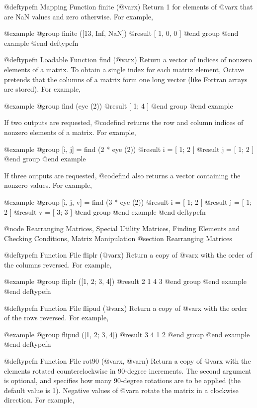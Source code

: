 @deftypefn {Mapping Function} {} finite (@var{x})
Return 1 for elements of @var{x} that are NaN values and zero
otherwise. For example,

@example
@group
finite ([13, Inf, NaN])
     @result{} [ 1, 0, 0 ]
@end group
@end example
@end deftypefn

@deftypefn {Loadable Function} {} find (@var{x})
Return a vector of indices of nonzero elements of a matrix.  To obtain a
single index for each matrix element, Octave pretends that the columns
of a matrix form one long vector (like Fortran arrays are stored).  For
example,

@example
@group
find (eye (2))
     @result{} [ 1; 4 ]
@end group
@end example

If two outputs are requested, @code{find} returns the row and column
indices of nonzero elements of a matrix.  For example,

@example
@group
[i, j] = find (2 * eye (2))
     @result{} i = [ 1; 2 ]
     @result{} j = [ 1; 2 ]
@end group
@end example

If three outputs are requested, @code{find} also returns a vector
containing the nonzero values.  For example,

@example
@group
[i, j, v] = find (3 * eye (2))
     @result{} i = [ 1; 2 ]
     @result{} j = [ 1; 2 ]
     @result{} v = [ 3; 3 ]
@end group
@end example
@end deftypefn
        
@node Rearranging Matrices, Special Utility Matrices, Finding Elements and Checking Conditions, Matrix Manipulation
@section Rearranging Matrices

@deftypefn {Function File} {} fliplr (@var{x})
Return a copy of @var{x} with the order of the columns reversed.  For
example, 

@example
@group
fliplr ([1, 2; 3, 4])
     @result{}  2  1
         4  3
@end group
@end example
@end deftypefn

@deftypefn {Function File} {} flipud (@var{x})
Return a copy of @var{x} with the order of the rows reversed.  For
example,

@example
@group
flipud ([1, 2; 3, 4])
     @result{}  3  4
         1  2
@end group
@end example
@end deftypefn

@deftypefn {Function File} {} rot90 (@var{x}, @var{n})
Return a copy of @var{x} with the elements rotated counterclockwise in
90-degree increments.  The second argument is optional, and specifies
how many 90-degree rotations are to be applied (the default value is 1).
Negative values of @var{n} rotate the matrix in a clockwise direction.
For example,

